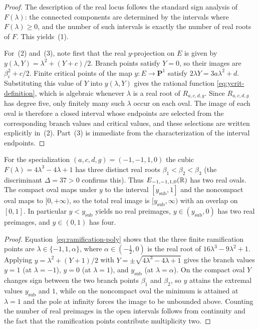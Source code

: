 \begin{proof}
The description of the real locus follows the standard sign analysis of $F(\lambda)$: the connected components are determined by the intervals where $F(\lambda)\ge0$, and the number of such intervals is exactly the number of real roots of $F$.
This yields~(1).

For~(2) and~(3), note first that the real $y$-projection on $E$ is given by $y(\lambda,Y)=\lambda^2+(Y+c)/2$.
Branch points satisfy $Y=0$, so their images are $\beta_i^2+c/2$.
Finite critical points of the map $y:E\to\mathbf P^1$ satisfy $2\lambda Y=3a\lambda^2+d$.
Substituting this value of $Y$ into $y(\lambda,Y)$ gives the rational function \eqref{eq:ycrit-definition}, which is algebraic whenever $\lambda$ is a real root of $R_{a,c,d,g}$.
Since $R_{a,c,d,g}$ has degree five, only finitely many such $\lambda$ occur on each oval.
The image of each oval is therefore a closed interval whose endpoints are selected from the corresponding branch values and critical values, and these selections are written explicitly in~(2).
Part~(3) is immediate from the characterization of the interval endpoints.
\end{proof}

\begin{corollary}\label{cor:two-interval-specialization}
For the specialization $(a,c,d,g)=(-1,-1,1,0)$ the cubic $F(\lambda)=4\lambda^3-4\lambda+1$ has three distinct real roots $\beta_1<\beta_2<\beta_3$ (the discriminant $\Delta=37>0$ confirms this).
Thus $E_{-1,-1,1,0}(\mathbb{R})$ has two real ovals.
The compact oval maps under $y$ to the interval $[y_{\mathrm{sub}},1]$ and the noncompact oval maps to $[0,+\infty)$, so the total real image is $[y_{\mathrm{sub}},\infty)$ with an overlap on $[0,1]$.
In particular $y<y_{\mathrm{sub}}$ yields no real preimages, $y\in(y_{\mathrm{sub}},0)$ has two real preimages, and $y\in(0,1)$ has four.
\end{corollary}

\begin{proof}
Equation~\eqref{eq:ramification-poly} shows that the three finite ramification points are $\lambda\in\{-1,1,\alpha\}$, where $\alpha\in(-\tfrac12,0)$ is the real root of $16\lambda^3-9\lambda^2+1$.
Applying $y=\lambda^2+(Y+1)/2$ with $Y=\pm\sqrt{4\lambda^3-4\lambda+1}$ gives the branch values $y=1$ (at $\lambda=-1$), $y=0$ (at $\lambda=1$), and $y_{\mathrm{sub}}$ (at $\lambda=\alpha$).
On the compact oval $Y$ changes sign between the two branch points $\beta_1$ and $\beta_2$, so $y$ attains the extremal values $y_{\mathrm{sub}}$ and $1$, while on the noncompact oval the minimum is attained at $\lambda=1$ and the pole at infinity forces the image to be unbounded above.
Counting the number of real preimages in the open intervals follows from continuity and the fact that the ramification points contribute multiplicity two.
\end{proof}

